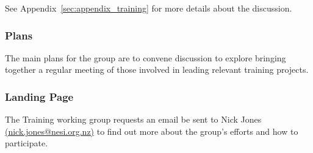See Appendix~\ref{sec:appendix_training} for more details about the discussion.

\subsubsection{Plans}

The main plans for the group are to convene discussion to explore bringing
together a regular meeting of those involved in leading relevant training
projects.

\subsubsection{Landing Page}

The Training working group requests an email be sent to Nick Jones
\href{mailto:nick.jones@nesi.org.nz}{(nick.jones@nesi.org.nz)} to find out more
about the group's efforts and how to participate.
